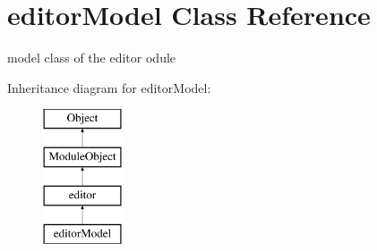 \hypertarget{classeditorModel}{\section{editor\+Model Class Reference}
\label{classeditorModel}
}


model class of the editor odule  


Inheritance diagram for editor\+Model\+:\begin{figure}[H]
\begin{center}
\leavevmode
\includegraphics[height=4.000000cm]{classeditorModel}
\end{center}
\end{figure}

